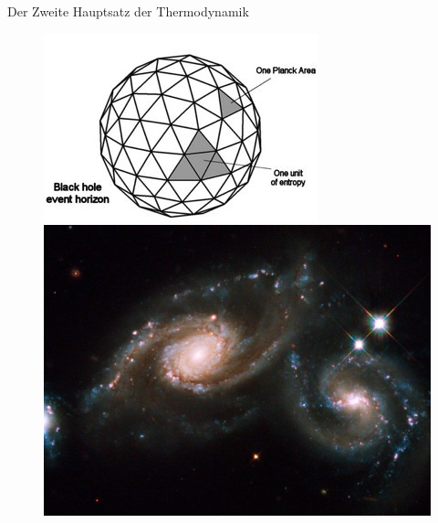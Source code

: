 \documentclass[PHONON = true, screen, ngerman]{beamer}
\begin{document}
	\begin{frame}{Der Zweite Hauptsatz der Thermodynamik}
		\begin{figure}
			\begin{minipage}[c]{0.45\textwidth}
				\includegraphics[width=\textwidth]{BHentropy1}
			\end{minipage}
			\hfill
			\begin{minipage}[c]{0.45\textwidth}
				\includegraphics[width=\textwidth]{kollidierendeSHs}
			\end{minipage}
		\end{figure}
	\end{frame} %
	
\end{document}
